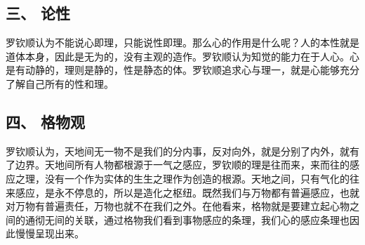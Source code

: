 \documentclass{article}
\begin{document}
\subsection{三、	论性}
罗钦顺认为不能说心即理，只能说性即理。那么心的作用是什么呢？人的本性就是道体本身，因此是无为的，没有主观的造作。罗钦顺认为知觉的能力在于人心。心是有动静的，理则是静的，性是静态的体。罗钦顺追求心与理一，就是心能够充分了解自己所有的性和理。
\subsection{四、	格物观}
罗钦顺认为，天地间无一物不是我们的分内事，反对向外，就是分别了内外，就有了边界。天地间所有人物都根源于一气之感应，罗钦顺的理是往而来，来而往的感应之理，没有一个作为实体的生生之理作为创造的根源。天地之间，只有气化的往来感应，是永不停息的，所以是造化之枢纽。既然我们与万物都有普遍感应，也就对万物有普遍责任，万物也就不在我们之外。在他看来，格物就是要建立起心物之间的通彻无间的关联，通过格物我们看到事物感应的条理，我们心的感应条理也因此慢慢呈现出来。
\end{document}
